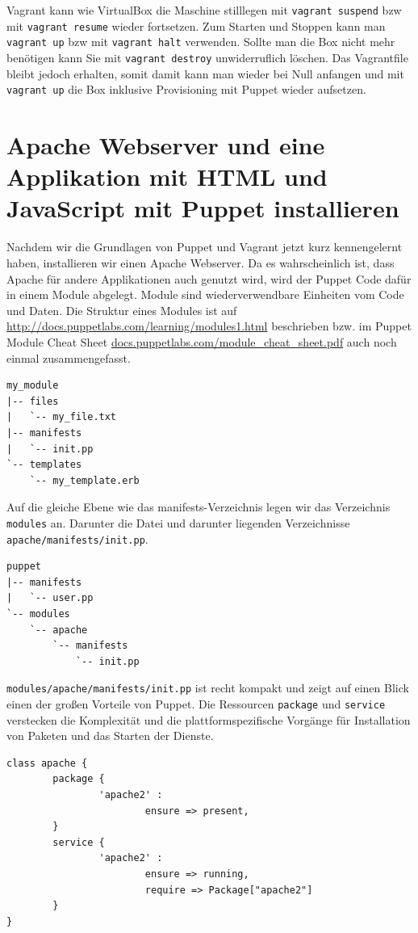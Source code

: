 \documentclass[12pt,a4paper,ngerman]{article}
\begin{document}
Vagrant kann wie VirtualBox die Maschine stilllegen mit \lstinline$vagrant suspend$ bzw mit \lstinline$vagrant resume$ wieder fortsetzen. Zum Starten und Stoppen kann man \lstinline$vagrant up$ bzw mit \lstinline$vagrant halt$ verwenden.  Sollte man die Box nicht mehr benötigen kann Sie mit \lstinline$vagrant destroy$ unwiderruflich löschen. Das Vagrantfile bleibt jedoch erhalten, somit damit kann man wieder bei Null anfangen und mit \lstinline$vagrant up$ die Box inklusive Provisioning mit Puppet wieder aufsetzen.

\section{Apache Webserver und eine Applikation mit HTML und JavaScript mit Puppet installieren}
Nachdem wir die Grundlagen von Puppet und Vagrant jetzt kurz kennengelernt haben, installieren wir einen Apache Webserver. Da es wahrscheinlich ist, dass Apache für andere Applikationen auch genutzt wird, wird der Puppet Code dafür in einem Module abgelegt. Module sind wiederverwendbare Einheiten vom Code und Daten. Die Struktur eines Modules ist auf \url{http://docs.puppetlabs.com/learning/modules1.html} beschrieben bzw. im Puppet Module Cheat Sheet \url{docs.puppetlabs.com/module_cheat_sheet.pdf} auch noch einmal zusammengefasst.

\begin{lstlisting}[language=tree,caption=Puppet Module Struktur, label=module_structure]
my_module
|-- files
|   `-- my_file.txt
|-- manifests
|   `-- init.pp
`-- templates
    `-- my_template.erb
\end{lstlisting}


Auf die gleiche Ebene wie das manifests-Verzeichnis legen wir das Verzeichnis \lstinline$modules$ an. Darunter die Datei und darunter liegenden Verzeichnisse \lstinline$apache/manifests/init.pp$.
\begin{lstlisting}[language=tree,caption=Verzeichnisstruktur für den apache-Module, label=apache-module]
puppet
|-- manifests
|   `-- user.pp
`-- modules
    `-- apache
        `-- manifests
            `-- init.pp
\end{lstlisting}

\lstinline$modules/apache/manifests/init.pp$ ist recht kompakt und zeigt auf einen Blick einen der großen Vorteile von Puppet. Die Ressourcen \lstinline$package$ und \lstinline$service$ verstecken die Komplexität und die plattformspezifische Vorgänge für Installation von Paketen und das Starten der Dienste.
\begin{lstlisting}[language=puppet,caption=Inhalt von modules/apache/manifests/init.pp, label=apache-init.pp]
class apache {
        package {
                'apache2' :
                        ensure => present,
        }
        service {
                'apache2' :
                        ensure => running,
                        require => Package["apache2"]
        }
}
\end{lstlisting}
\end{document}
